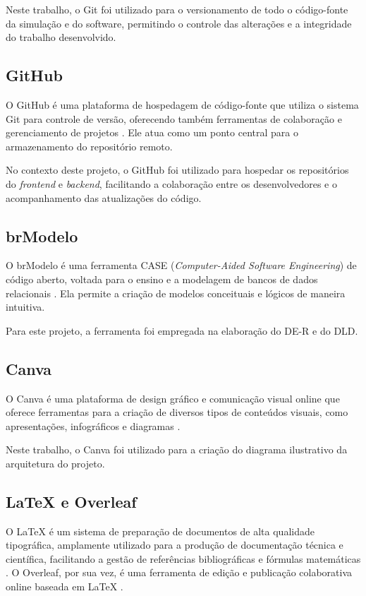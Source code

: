 Neste trabalho, o Git foi utilizado para o versionamento de todo o código-fonte da simulação e do software, permitindo o controle das alterações e a integridade do trabalho desenvolvido.

\subsection[GitHub]{GitHub}
O GitHub é uma plataforma de hospedagem de código-fonte que utiliza o sistema Git para controle de versão, oferecendo também ferramentas de colaboração e gerenciamento de projetos \cite{github2026}. Ele atua como um ponto central para o armazenamento do repositório remoto.

No contexto deste projeto, o GitHub foi utilizado para hospedar os repositórios do \textit{frontend} e \textit{backend}, facilitando a colaboração entre os desenvolvedores e o acompanhamento das atualizações do código.

\subsection[brModelo]{brModelo}
O brModelo é uma ferramenta CASE (\textit{Computer-Aided Software Engineering}) de código aberto, voltada para o ensino e a modelagem de bancos de dados relacionais \cite{candido2020brmodelo}. Ela permite a criação de modelos conceituais e lógicos de maneira intuitiva.

Para este projeto, a ferramenta foi empregada na elaboração do DE-R e do DLD.

\subsection[Canva]{Canva}
O Canva é uma plataforma de design gráfico e comunicação visual online que oferece ferramentas para a criação de diversos tipos de conteúdos visuais, como apresentações, infográficos e diagramas \cite{canva2026}.

Neste trabalho, o Canva foi utilizado para a criação do diagrama ilustrativo da arquitetura do projeto.

\subsection[LaTeX e Overleaf]{LaTeX e Overleaf}

O LaTeX é um sistema de preparação de documentos de alta qualidade tipográfica, amplamente utilizado para a produção de documentação técnica e científica, facilitando a gestão de referências bibliográficas e fórmulas matemáticas \cite{latex2026}. O Overleaf, por sua vez, é uma ferramenta de edição e publicação colaborativa online baseada em LaTeX \cite{overleaf2026}.

